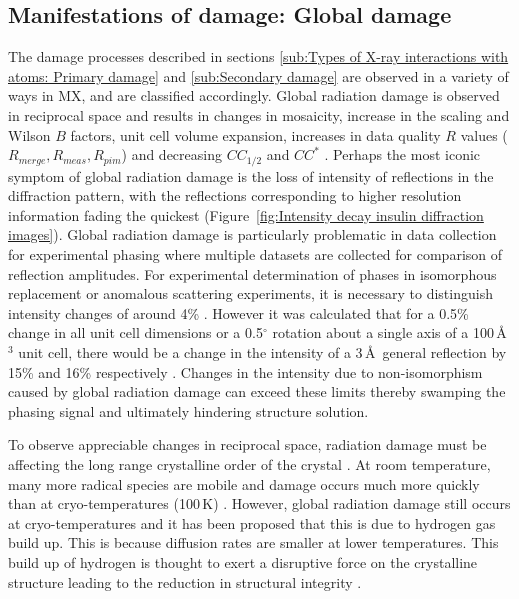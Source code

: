     \subsection{Manifestations of damage: Global damage}
    \label{sub:Manifestations of damage: Global damage}
        The damage processes described in sections \ref{sub:Types of X-ray interactions with atoms: Primary damage} and \ref{sub:Secondary damage} are observed in a variety of ways in MX, and are classified accordingly.
        Global radiation damage is observed in reciprocal space and results in changes in mosaicity, increase in the scaling and Wilson $B$ factors, unit cell volume expansion, increases in data quality $R$ values ($R_{merge}, R_{meas}, R_{pim}$) and decreasing $CC_{1/2}$ and $CC^*$ \cite{garman2010}.
        Perhaps the most iconic symptom of global radiation damage is the loss of intensity of reflections in the diffraction pattern, with the reflections corresponding to higher resolution information fading the quickest (Figure~\ref{fig:Intensity decay insulin diffraction images}).
        Global radiation damage is particularly problematic in data collection for experimental phasing where multiple datasets are collected for comparison of reflection amplitudes.
        For experimental determination of phases in isomorphous replacement or anomalous scattering experiments, it is necessary to distinguish intensity changes of around 4\% \cite{taylor2010}.
        However it was calculated that for a 0.5\% change in all unit cell dimensions or a 0.5$^{\circ}$ rotation about a single axis of a 100\,\AA$^3$ unit cell, there would be a change in the intensity of a 3\,\AA\ general reflection by 15\% and 16\% respectively \cite{crick1956}.
        Changes in the intensity due to non-isomorphism caused by global radiation damage can exceed these limits thereby swamping the phasing signal and ultimately hindering structure solution.

        To observe appreciable changes in reciprocal space, radiation damage must be affecting the long range crystalline order of the crystal \cite{meents2010}.
        At room temperature, many more radical species are mobile and damage occurs much more quickly than at cryo-temperatures (100\,K) \cite{henderson1990cryo,weik2010temperature}.
        However, global radiation damage still occurs at cryo-temperatures and it has been proposed that this is due to hydrogen gas build up.
		This is because diffusion rates are smaller at lower temperatures.
		This build up of hydrogen is thought to exert a disruptive force on the crystalline structure leading to the reduction in structural integrity \cite{meents2010}.


